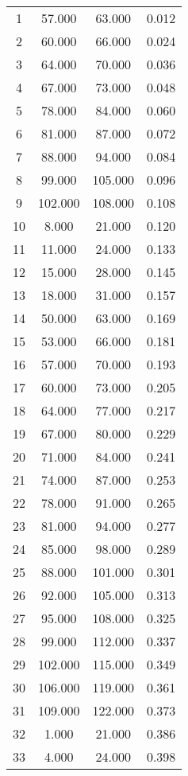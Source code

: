 % 
\begin{tabular}{cccc}
  \hline
  \hline
1 & 57.000 & 63.000 & 0.012 \\ 
  2 & 60.000 & 66.000 & 0.024 \\ 
  3 & 64.000 & 70.000 & 0.036 \\ 
  4 & 67.000 & 73.000 & 0.048 \\ 
  5 & 78.000 & 84.000 & 0.060 \\ 
  6 & 81.000 & 87.000 & 0.072 \\ 
  7 & 88.000 & 94.000 & 0.084 \\ 
  8 & 99.000 & 105.000 & 0.096 \\ 
  9 & 102.000 & 108.000 & 0.108 \\ 
  10 & 8.000 & 21.000 & 0.120 \\ 
  11 & 11.000 & 24.000 & 0.133 \\ 
  12 & 15.000 & 28.000 & 0.145 \\ 
  13 & 18.000 & 31.000 & 0.157 \\ 
  14 & 50.000 & 63.000 & 0.169 \\ 
  15 & 53.000 & 66.000 & 0.181 \\ 
  16 & 57.000 & 70.000 & 0.193 \\ 
  17 & 60.000 & 73.000 & 0.205 \\ 
  18 & 64.000 & 77.000 & 0.217 \\ 
  19 & 67.000 & 80.000 & 0.229 \\ 
  20 & 71.000 & 84.000 & 0.241 \\ 
  21 & 74.000 & 87.000 & 0.253 \\ 
  22 & 78.000 & 91.000 & 0.265 \\ 
  23 & 81.000 & 94.000 & 0.277 \\ 
  24 & 85.000 & 98.000 & 0.289 \\ 
  25 & 88.000 & 101.000 & 0.301 \\ 
  26 & 92.000 & 105.000 & 0.313 \\ 
  27 & 95.000 & 108.000 & 0.325 \\ 
  28 & 99.000 & 112.000 & 0.337 \\ 
  29 & 102.000 & 115.000 & 0.349 \\ 
  30 & 106.000 & 119.000 & 0.361 \\ 
  31 & 109.000 & 122.000 & 0.373 \\ 
  32 & 1.000 & 21.000 & 0.386 \\ 
  33 & 4.000 & 24.000 & 0.398 \\ 

\end{tabular}
